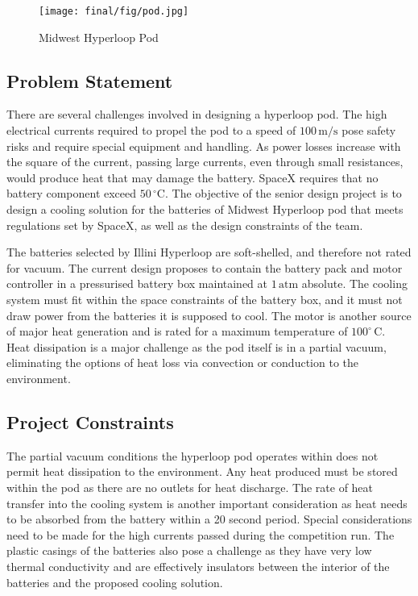 \documentclass[11pt]{article}
\numberwithin{equation}{subsection} %
\newcommand{\degrees}{\ensuremath{^\circ}} %
\newcommand{\unit}[1]{\ensuremath{\, \mathrm{#1}}}             %
\newcommand{\degree}{^\circ}                                   %
\begin{document}
\begin{figure}[!htb]
 \centering
	\texttt{[image: final/fig/pod.jpg]}
    \caption{Midwest Hyperloop Pod}
    \label{fig:pod}
\end{figure}

\subsection{Problem Statement}
There are several challenges involved in designing a hyperloop pod. The high electrical currents required to propel the pod to a speed of $100\unit{m/s}$ pose safety risks and require special equipment and handling. As power losses increase with the square of the current, passing large currents, even through small resistances, would produce heat that may damage the battery. SpaceX requires that no battery component exceed $50\unit{\degrees C}$. The objective of the senior design project is to design a cooling solution for the batteries of Midwest Hyperloop pod that meets regulations set by SpaceX, as well as the design constraints of the team.

The batteries selected by Illini Hyperloop are soft-shelled, and therefore not rated for vacuum. The current design proposes to contain the battery pack and motor controller in a pressurised battery box maintained at $1\unit{atm}$ absolute. The cooling system must fit within the space constraints of the battery box, and it must not draw power from the batteries it is supposed to cool. The motor is another source of major heat generation and is rated for a maximum temperature of $100\degree\unit{C}$. Heat dissipation is a major challenge as the pod itself is in a partial vacuum, eliminating the options of heat loss via convection or conduction to the environment.

\pagebreak

\subsection{Project Constraints}
The partial vacuum conditions the hyperloop pod operates within does not permit heat dissipation to the environment. Any heat produced must be stored within the pod as there are no outlets for heat discharge. The rate of heat transfer into the cooling system is another important consideration as heat needs to be absorbed from the battery within a 20 second period. Special considerations need to be made for the high currents passed during the competition run. The plastic casings of the batteries also pose a challenge as they have very low thermal conductivity and are effectively insulators between the interior of the batteries and the proposed cooling solution.
\end{document}
